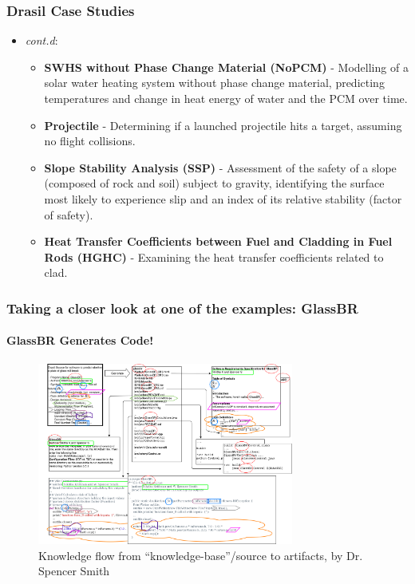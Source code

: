 \documentclass{beamer}
\begin{document}
\begin{frame}
    \frametitle{Drasil Case Studies}
    \begin{itemize}
        \item<1-> \emph{cont.d}\footnotemark[1]:
            \begin{itemize}
                \item<1-> \textbf{SWHS without Phase Change Material (NoPCM)} - Modelling of a solar water heating system without phase change material, predicting temperatures and change in heat energy of water and the PCM over time.
                \item<2-> \textbf{Projectile} - Determining if a launched projectile hits a target, assuming no flight collisions.
                \item<3-> \textbf{Slope Stability Analysis (SSP)} - Assessment of the safety of a slope (composed of rock and soil) subject to gravity, identifying the surface most likely to experience slip and an index of its relative stability (factor of safety).
                \item<4-> \textbf{Heat Transfer Coefficients between Fuel and Cladding in Fuel Rods (HGHC)} - Examining the heat transfer coefficients related to clad.
            \end{itemize}
    \end{itemize}


\end{frame}

\begin{frame}
    \frametitle{Taking a closer look at one of the examples: GlassBR}
    \framesubtitle{GlassBR Generates Code!}
    \begin{figure}
        \center
        \includegraphics[width=0.75\textwidth]{assets/DrasilSupportsChange.png}
        \caption{Knowledge flow from ``knowledge-base''/source to artifacts, by Dr. Spencer Smith}
        \label{fig:glassbr}
    \end{figure}
\end{frame}
\end{document}
